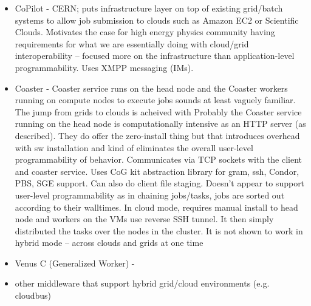 \documentclass[times]{cpeauth}
\newcommand{\note}[1]{ {\textcolor{magenta} { ***Note: #1 }}}
\newcommand{\note}[1]{}
\begin{document}


\begin{itemize}

       \item CoPilot - CERN; puts infrastructure layer on top of existing grid/batch systems to allow job submission to clouds such as Amazon EC2 or Scientific Clouds. Motivates the case for high energy physics community having requirements for what we are essentially doing with cloud/grid interoperability -- focused more on the infrastructure than application-level programmability. Uses XMPP messaging (IMs). 
	\item Coaster - Coaster service runs on the head node and the Coaster workers running on compute nodes to execute jobs sounds at least vaguely familiar. The jump from grids to clouds is acheived with  Probably the Coaster service running on the head node is computationally intensive as an  HTTP server (as described). They do offer the zero-install thing but that introduces overhead with sw installation and kind of eliminates the overall user-level programmability of behavior. Communicates via TCP sockets with the client and coaster service. Uses CoG kit abstraction library for gram, ssh, Condor, PBS, SGE support. Can also do client file staging. Doesn't appear to support user-level programmability as in chaining jobs/tasks, jobs are sorted out according to their walltimes. In cloud mode, requires manual install to head node and workers on the VMs use reverse SSH tunnel. It then simply distributed the tasks over the nodes in the cluster. It is not shown to work in hybrid mode -- across clouds and grids at one time
	\item Venus C (Generalized Worker) - 
	\item other middleware that support hybrid grid/cloud environments (e.g. cloudbus)
\end{itemize}
\end{document}
